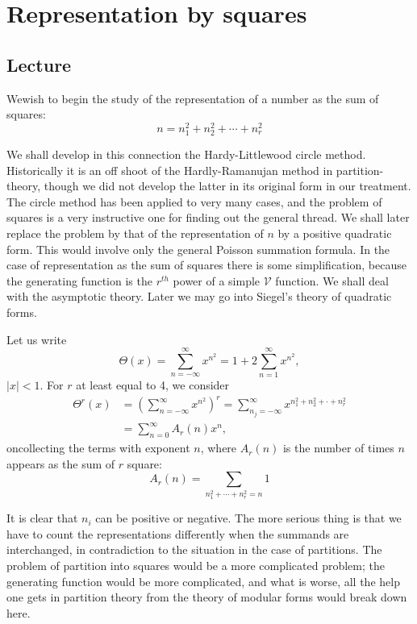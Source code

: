 \part{Representation by squares}\label{part4}

\chapter{Lecture}\label{part4:lec33} %

We\pageoriginale wish to begin the study of the representation of a
number as the sum of squares:
$$
n= n^2_1+ n^2_2 + \cdots + n^2_r
$$

We shall develop in this connection the Hardy-Littlewood circle
method. Historically it is an off shoot of the Hardly-Ramanujan method
in partition-theory, though we did not develop the latter in its
original form in our treatment. The circle method has been applied to
very many cases, and the problem of squares is a very instructive one
for finding out the general thread. We shall later replace the problem
by that of the representation of $n$ by a positive quadratic
form. This would involve only the general Poisson summation
formula. In the case of  representation as the sum of squares there is
some simplification, because the generating function is the $r^{th}$
power of a simple $\mathscr{V}$ function. We shall deal with the asymptotic
theory. Later we may go into Siegel's theory of quadratic forms. 

Let us write
$$
\Theta (x) = \sum^\infty_{n=- \infty} x^{n^2} = 1 + 2
\sum^\infty_{n=1} x^{n^2},
$$
$|x|<1$. For $r$ at least equal to 4, we consider
\begin{align*}
  \Theta^r (x) & = \left(\sum^\infty_{n=- \infty}x^{n^2} \right)^r =
  \sum^\infty_{n_j=- \infty} x^{n_1^2+ n^2_2 + \cdot + n_r^2}\\
  & = \sum^\infty_{n=0} A_r (n) x^n,
\end{align*}
on\pageoriginale collecting the terms with exponent $n$, where $A_r(n)$ is
the number of times $n$ appears as the sum of $r$ square:
$$
A_r (n) = \sum_{n_1^2 + \cdots + n_r^2=n}1
$$

It is clear that $n_i$ can be positive or negative. The more serious
thing is that we have to count the representations differently when
the 
summands are interchanged, in contradiction to the situation in the case
of partitions. The problem of partition into squares would be a more
complicated problem; the generating function would be more complicated,
and what is worse, all the help one gets in partition theory from the
theory of modular forms would break down here.

